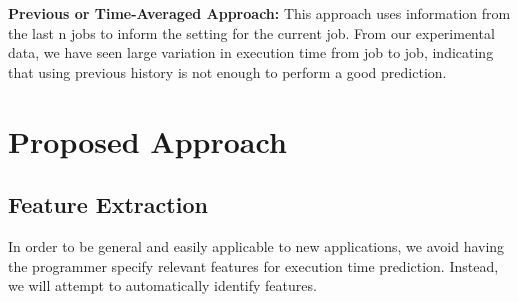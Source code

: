 \documentclass[11pt, letterpaper]{article}
\providecommand{\dotgraph}[2]{
    \vspace{-0.6in}
    \begin{center}
    \digraph[scale=0.75]{#1}{#2}
    \end{center}
    \vspace{-0.6in}
  }
\begin{document}
\noindent\textbf{Previous or Time-Averaged Approach: } This approach uses information
from the last n jobs to inform the setting for the current job. From our
experimental data, we have seen large variation in execution time from job to
job, indicating that using previous history is not enough to perform a good
prediction.

\section{Proposed Approach}

\subsection{Feature Extraction}

% 

In order to be general and easily applicable to new applications, we avoid
having the programmer specify relevant features for execution time prediction.
Instead, we will attempt to automatically identify features.
\end{document}
